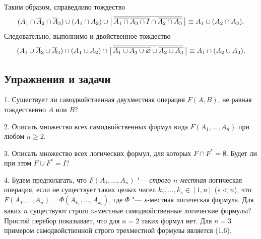 \begin{figure}[h]
\centering
{}\qquad\qquad
{}
\end{figure}

{\small\noindent Таким образом, справедливо тождество
\[
(A_1\cap\overline{A}_2\cap\overline{A}_3)\cup(A_1\cap A_2)\cup
\bigl[\,\overline{\overline{A_1\cap A_3\cap I}\cap\overline{A_2\cap A_3}}\,\bigr]\equiv A_1\cup(A_2\cap A_3).
\]
Следовательно, выполнимо и двойственное тождество
\[
(A_1\cup\overline{A}_2\cup\overline{A}_3)\cap(A_1\cup A_2)\cap
\bigl[\,\overline{\overline{A_1\cup A_3\cup\varnothing}\cup\overline{A_2\cup A_3}}\,\bigr]\equiv A_1\cap(A_2\cup A_3).
\]\par}

\subsection*{Упражнения и задачи}
1. Существует ли самодвойственная двухместная операция $F(A,B)$, не равная
тождественно $A$ или $B$?

2. Описать множество всех самодвойственных формул вида $F(A_1,\dots,A_n)$
при любом $n\ge2$.

3. Описать множество всех логических формул, для которых
$F\cap F^*=\emptyset$. Будет ли при этом $F\cup F^*=I$?

4. Будем
предполагать, что $F(A_1,\dots,A_n)$ "--- \emph{строго $n$-местная}
логическая операция, если не существует таких целых чисел
$k_1,\dots,k_s\in[1,n]$ ($s<n$), что
$F(A_1,\dots,A_n)=\Phi(A_{k_1},\dots,A_{k_s})$, где $\Phi$ "--- $s$-местная
логическая формула. Для каких $n$ существуют строго $n$-местные
самодвойственные логические формулы? Простой перебор показывает, что для
$n=2$ таких формул нет. Для $n=3$ примером самодвойственной строго
трехместной формулы является (1.6).

